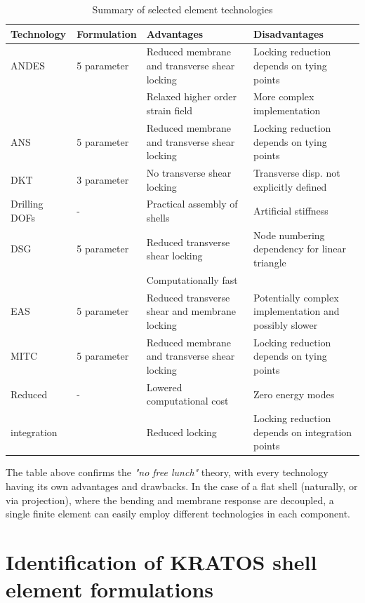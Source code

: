 \singlespacing
\begin{table}[H]
	\begin{tabularx}{\textwidth}{ | l | l |  X | X | }
		\hline
		\textbf{Technology} 		& 	\textbf{Formulation}	&		\textbf{Advantages}	&		\textbf{Disadvantages}\\
		\hline
		ANDES	& 5 parameter &	Reduced membrane and transverse shear locking &  Locking reduction depends on tying points \\
		\ &\  & Relaxed higher order strain field & More complex implementation \\
		\hline
		ANS & 5 parameter		&  Reduced membrane and transverse shear locking & Locking reduction depends on tying points \\
		\hline
		DKT	&  3 parameter		 & 	No transverse shear locking & Transverse disp. not explicitly defined \\
		\hline
		Drilling DOFs	  &  - & Practical assembly of shells & Artificial stiffness \\
		\hline
		DSG	&	 5 parameter	& Reduced transverse shear locking	& Node numbering dependency for linear triangle \\
		\ &\  & Computationally fast & \  \\
		\hline
		EAS 	  &		  5 parameter		&		Reduced transverse shear and membrane locking & Potentially complex implementation and possibly slower \\
		\hline
		MITC	&		5 parameter	&		Reduced membrane and transverse shear locking & Locking reduction depends on tying points \\
		\hline
		Reduced &		-		&	 Lowered computational cost & Zero energy modes \\
		integration &\  & Reduced locking & Locking reduction depends on integration points \\ 
		\hline
	\end{tabularx}
	\caption{Summary of selected element technologies}
	\label{table:1}
\end{table}

\doublespacing

The table above confirms the \textit{"no free lunch"} theory, with every technology having its own advantages and drawbacks. In the case of a flat shell (naturally, or via projection), where the bending and membrane response are decoupled, a single finite element can easily employ different technologies in each component. 

\section{Identification of KRATOS shell element formulations}

